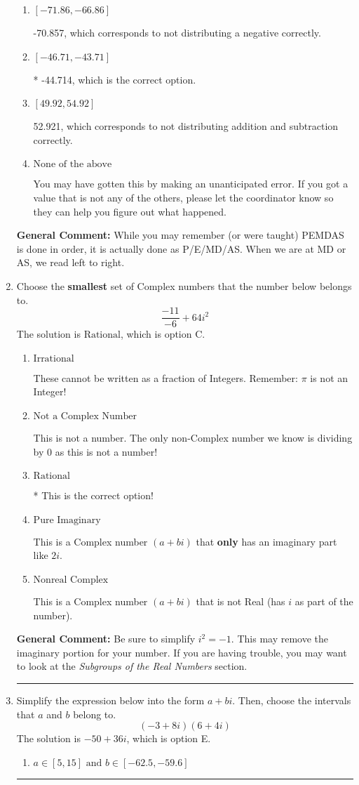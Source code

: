 \documentclass{extbook}[14pt]
\newcommand{\litem}[1]{\item #1

\rule{\textwidth}{0.4pt}}
\begin{document}
\begin{enumerate}
{\begin{enumerate}[label=\Alph*.]
 -19.079, which corresponds to an Order of Operations error: not reading left-to-right for multiplication/division.
\item \( [-71.86, -66.86] \)

 -70.857, which corresponds to not distributing a negative correctly.
\item \( [-46.71, -43.71] \)

* -44.714, which is the correct option.
\item \( [49.92, 54.92] \)

 52.921, which corresponds to not distributing addition and subtraction correctly.
\item \( \text{None of the above} \)

 You may have gotten this by making an unanticipated error. If you got a value that is not any of the others, please let the coordinator know so they can help you figure out what happened.
\end{enumerate}

\textbf{General Comment:} While you may remember (or were taught) PEMDAS is done in order, it is actually done as P/E/MD/AS. When we are at MD or AS, we read left to right.
}
\litem{
Choose the \textbf{smallest} set of Complex numbers that the number below belongs to.
\[ \frac{-11}{-6}+64i^2 \]The solution is \( \text{Rational} \), which is option C.\begin{enumerate}[label=\Alph*.]
\item \( \text{Irrational} \)

These cannot be written as a fraction of Integers. Remember: $\pi$ is not an Integer!
\item \( \text{Not a Complex Number} \)

This is not a number. The only non-Complex number we know is dividing by 0 as this is not a number!
\item \( \text{Rational} \)

* This is the correct option!
\item \( \text{Pure Imaginary} \)

This is a Complex number $(a+bi)$ that \textbf{only} has an imaginary part like $2i$.
\item \( \text{Nonreal Complex} \)

This is a Complex number $(a+bi)$ that is not Real (has $i$ as part of the number).
\end{enumerate}

\textbf{General Comment:} Be sure to simplify $i^2 = -1$. This may remove the imaginary portion for your number. If you are having trouble, you may want to look at the \textit{Subgroups of the Real Numbers} section.
}
\litem{
Simplify the expression below into the form $a+bi$. Then, choose the intervals that $a$ and $b$ belong to.
\[ (-3 + 8 i)(6 + 4 i) \]The solution is \( -50 + 36 i \), which is option E.\begin{enumerate}[label=\Alph*.]
\item \( a \in [5, 15] \text{ and } b \in [-62.5, -59.6] \)


\end{enumerate}}
\end{enumerate}
\end{document}

